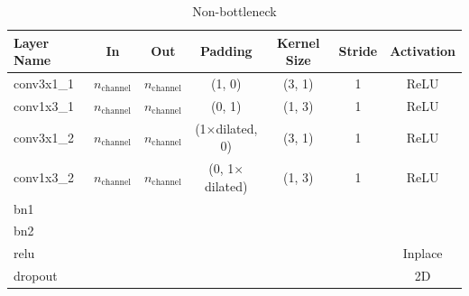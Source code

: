 \begin{table}[ht]
	\setlength{\abovecaptionskip}{10pt}
	\centering
	\begin{tabular}{|l|c|c|c|c|c|c|}
		\hline
		\textbf{Layer Name} & \textbf{In}          & \textbf{Out}         & \textbf{Padding}      & \textbf{Kernel Size} & \textbf{Stride} & \textbf{Activation} \\
		\hline
		conv3x1\_1          & $n_{\text{channel}}$ & $n_{\text{channel}}$ & (1, 0)                & (3, 1)               & 1               & ReLU                \\
		\hline
		conv1x3\_1          & $n_{\text{channel}}$ & $n_{\text{channel}}$ & (0, 1)                & (1, 3)               & 1               & ReLU                \\
		\hline
		conv3x1\_2          & $n_{\text{channel}}$ & $n_{\text{channel}}$ & (1$\times$dilated, 0) & (3, 1)               & 1               & ReLU                \\
		\hline
		conv1x3\_2          & $n_{\text{channel}}$ & $n_{\text{channel}}$ & (0, 1$\times$dilated) & (1, 3)               & 1               & ReLU                \\
		\hline
		bn1                 &                      &                      &                       &                      &                 &                     \\
		\hline
		bn2                 &                      &                      &                       &                      &                 &                     \\
		\hline
		relu                &                      &                      &                       &                      &                 & Inplace             \\
		\hline
		dropout             &                      &                      &                       &                      &                 & 2D                  \\
		\hline
	\end{tabular}
	\caption{Non-bottleneck}
\end{table}

